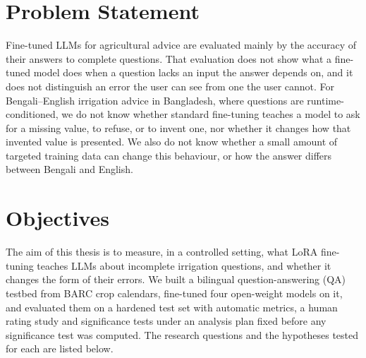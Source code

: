 \section{Problem Statement}
\label{sec:problem}

Fine-tuned LLMs for agricultural advice are evaluated mainly by the accuracy of their answers to complete questions. That evaluation does not show what a fine-tuned model does when a question lacks an input the answer depends on, and it does not distinguish an error the user can see from one the user cannot. For Bengali--English irrigation advice in Bangladesh, where questions are runtime-conditioned, we do not know whether standard fine-tuning teaches a model to ask for a missing value, to refuse, or to invent one, nor whether it changes how that invented value is presented. We also do not know whether a small amount of targeted training data can change this behaviour, or how the answer differs between Bengali and English.

\section{Objectives}
\label{sec:objectives}

The aim of this thesis is to measure, in a controlled setting, what LoRA fine-tuning teaches LLMs about incomplete irrigation questions, and whether it changes the form of their errors. We built a bilingual question-answering (QA) testbed from BARC crop calendars, fine-tuned four open-weight models on it, and evaluated them on a hardened test set with automatic metrics, a human rating study and significance tests under an analysis plan fixed before any significance test was computed. The research questions and the hypotheses tested for each are listed below.

